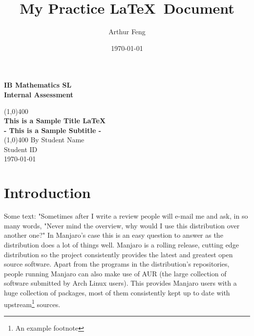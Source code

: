 \documentclass[11pt]{article}
\theoremstyle{definition}
\begin{document}
	
\begin{titlepage}
\begin{center}
\vspace*{1cm}  %
\Large{\textbf{IB Mathematics SL}}\\
\Large{\textbf{Internal Assessment}}\\
\vfill  %
		

\line(1,0){400}\\ [1mm] %

\huge{\textbf{This is a Sample Title  \LaTeX }} \\ [3mm]
\Large{\textbf{- This is a Sample Subtitle -}}\\ [1mm]
\line(1,0){400}
\vfill
By Student Name\\
Student ID \\
\today %

\end{center}
\end{titlepage}


\tableofcontents
\thispagestyle{empty} %
\clearpage %



\setcounter{page}{1} %

\title{My Practice \LaTeX \  Document}
\author{Arthur Feng}
\date{\today}
\maketitle 

\section{Introduction}

Some text: "Sometimes after I write a review people will e-mail me and ask\cite{DBHS1}, in so many words, "Never mind the overview, why would I use this distribution over another one?" In Manjaro's case this is an easy question to answer as the distribution does a lot of things well. Manjaro is a rolling release, cutting edge distribution so the project consistently provides the latest and greatest open source software. Apart from the programs in the distribution's repositories, people running Manjaro can also make use of AUR (the large collection of software submitted by Arch Linux users). This provides Manjaro users with a huge collection of packages, most of them consistently kept up to date with upstream\footnote{An example footnote} sources.\\
\end{document}
